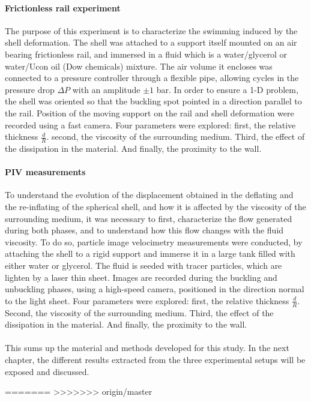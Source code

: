 \paragraph{Frictionless rail experiment}
The purpose of this experiment is to characterize the swimming induced by the shell deformation.
The shell was attached to a support itself mounted on an air bearing frictionless rail, and immersed in a fluid which is a water/glycerol or water/Ucon oil (Dow chemicals) mixture. The air volume it encloses was connected to a pressure controller through a flexible pipe, allowing cycles in the pressure drop $\Delta P$ with an amplitude $\pm 1$ bar. In order to ensure a 1-D problem, the shell was oriented so that the buckling spot pointed in a direction parallel to the rail. Position of the moving support on the rail and shell deformation were recorded using a fast camera. Four parameters were explored: first, the relative thickness $\frac{d}{R}$. second, the viscosity of the surrounding medium. Third, the effect of the dissipation in the material. And finally, the proximity to the wall.

\paragraph{PIV measurements}
To understand the evolution of the displacement obtained in the deflating and the re-inflating of the spherical shell, and how it is affected by the viscosity of the surrounding medium, it was necessary to first, characterize the flow generated during both phases, and to understand how this flow changes with the fluid viscosity. To do so, particle image velocimetry measurements were conducted, by attaching the shell to a rigid support and immerse it in a large tank filled with either water or glycerol. The fluid is seeded with tracer particles, which are lighten by a laser thin sheet. Images are recorded during the buckling and unbuckling phases, using a high-speed camera, positioned in the direction normal to the light sheet. Four parameters were explored: first, the relative thickness $\frac{d}{R}$. Second, the viscosity of the surrounding medium. Third, the effect of the dissipation in the material. And finally, the proximity to the wall.

\paragraph{}
This sums up the material and methods developed for this study. In the next chapter, the different results extracted from the three experimental setups will be exposed and discussed. 







  

  
 

=======
>>>>>>> origin/master


 